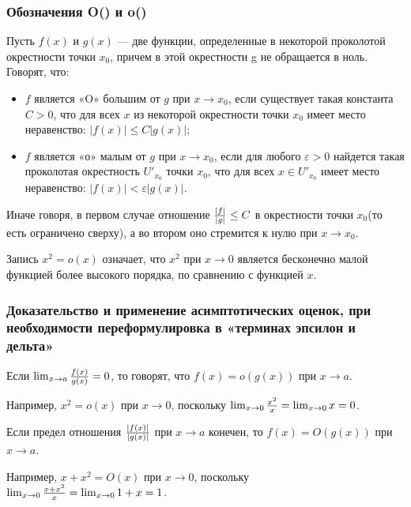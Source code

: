 \documentclass[12pt]{matmex-diploma}
\begin{document}
            
        \subsubsection*{Обозначения O() и o()}
            
            Пусть $f(x)$ и $g(x)$ — две функции, определенные в некоторой проколотой окрестности точки $x_0$, причем в этой окрестности g не обращается в ноль. Говорят, что:
                \begin{itemize}
                \item $f$ является «O» большим от $g$ при $x \to x_0$, если существует такая константа $C > 0$, что для всех $x$ из некоторой окрестности точки $x_0$ имеет место неравенство: $|f(x)|\leq C|g(x)|$;
                \item $f$ является «о» малым от $g$ при $x \to x_0$, если для любого $\varepsilon>0$ найдется такая проколотая окрестность $U'_{x_0}$ точки $x_0$, что для всех $x \in U'_{x_0}$ имеет место неравенство: $|f(x)| < \varepsilon|g(x)|$.
                \end{itemize} 
            
            Иначе говоря, в первом случае отношение ${|f| \over |g|} \leq C$ в окрестности точки $x_0$(то есть ограничено сверху), а во втором оно стремится к нулю при $x \to x_0$.
            
            Запись $x^2 = o(x)$ означает, что $x^2$ при $x \to 0$ является бесконечно малой функцией более высокого порядка, по сравнению с функцией $x$.
            
        \subsubsection*{Доказательство и применение асимптотических оценок, при необходимости переформулировка в «терминах эпсилон и дельта»}
            
            Если $\lim_{x \to a}{f(x) \over g(x)} = 0$, то говорят, что \textbf{$f(x) = o(g(x))$} при $x \to a$.
            
            Например, $x^2 = o(x)$ при $x \to 0$, поскольку $\lim_{x \to 0}{{x^2} \over x} = \lim_{x \to 0}{x} = 0$.
            
            Если предел отношения $|f(x)| \over |g(x)|$ при $x \to a$ конечен, то \textbf{$f(x) = O(g(x))$} при $x \to a$.
            
            Например, $x + x^2 = O(x)$ при $x \to 0$, поскольку $\lim_{x \to 0}{{x + x^2} \over x} = \lim_{x \to 0}{1+x} = 1$.
            
\end{document}
